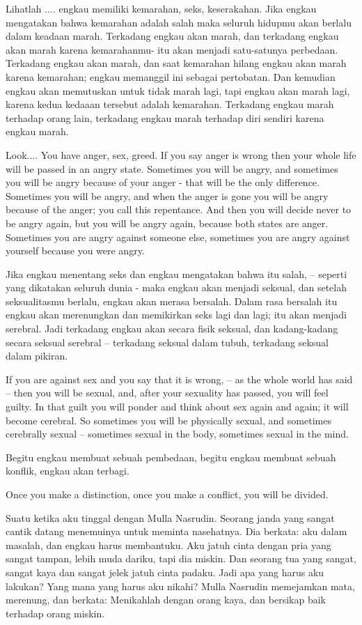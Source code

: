\bahasa
Lihatlah .... engkau memiliki kemarahan, seks, keserakahan. Jika engkau mengatakan bahwa kemarahan adalah salah maka seluruh hidupmu akan berlalu dalam keadaan marah. Terkadang engkau akan marah, dan terkadang engkau akan marah karena kemarahanmu- itu akan menjadi satu-satunya perbedaan. Terkadang engkau akan marah, dan saat kemarahan hilang engkau akan marah karena kemarahan; engkau memanggil ini sebagai pertobatan. Dan kemudian engkau akan memutuskan untuk tidak marah lagi, tapi engkau akan marah lagi, karena kedua kedaaan tersebut adalah kemarahan. Terkadang engkau marah terhadap orang lain, terkadang engkau marah terhadap diri sendiri karena engkau marah.

\english
Look.... You have anger, sex, greed. If you say anger is wrong then your whole life will be passed in an angry state. Sometimes you will be angry, and sometimes you will be angry because of your anger - that will be the only difference. Sometimes you will be angry, and when the anger is gone you will be angry because of the anger; you call this repentance. And then you will decide never to be angry again, but you will be angry again, because both states are anger. Sometimes you are angry against someone else, sometimes you are angry against yourself because you were angry.

\bahasa
Jika engkau menentang seks dan engkau mengatakan bahwa itu salah, -- seperti yang dikatakan seluruh dunia - maka engkau akan menjadi seksual, dan setelah seksualitasmu berlalu, engkau akan merasa bersalah. Dalam rasa bersalah itu engkau akan merenungkan dan memikirkan seks lagi dan lagi; itu akan menjadi serebral. Jadi terkadang engkau akan secara fisik seksual, dan kadang-kadang secara seksual serebral -- terkadang seksual dalam tubuh, terkadang seksual dalam pikiran.

\english
If you are against sex and you say that it is wrong, -- as the whole world has said -- then you will be sexual, and, after your sexuality has passed, you will feel guilty. In that guilt you will ponder and think about sex again and again; it will become cerebral. So sometimes you will be physically sexual, and sometimes cerebrally sexual -- sometimes sexual in the body, sometimes sexual in the mind.

\bahasa
Begitu engkau membuat sebuah pembedaan, begitu engkau membuat sebuah konflik, engkau akan terbagi.

\english
Once you make a distinction, once you make a conflict, you will be divided.

\bahasa
Suatu ketika aku tinggal dengan Mulla Nasrudin. Seorang janda yang sangat cantik datang menemuinya untuk meminta nasehatnya. Dia berkata: aku dalam masalah, dan engkau harus membantuku. Aku jatuh cinta dengan pria yang sangat tampan, lebih muda dariku, tapi dia miskin. Dan seorang tua yang sangat, sangat kaya dan sangat jelek jatuh cinta padaku. Jadi apa yang harus aku lakukan? Yang mana yang harus aku nikahi? Mulla Nasrudin memejamkan mata, merenung, dan berkata: Menikahlah dengan orang kaya, dan bersikap baik terhadap orang miskin.

